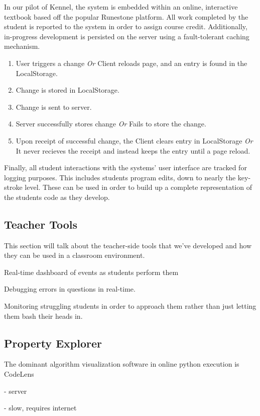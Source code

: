\documentclass{sig-alternate}
\begin{document}
In our pilot of Kennel, the system is embedded within an online, interactive textbook based off the popular Runestone platform. %
All work completed by the student is reported to the system in order to assign course credit.
Additionally, in-progress development is persisted on the server using a fault-tolerant caching mechanism.
\begin{enumerate}
  \item User triggers a change \textit{Or} Client reloads page, and an entry is found in the LocalStorage.
	\item Change is stored in LocalStorage.
	\item Change is sent to server.
  \item Server successfully stores change \textit{Or} Fails to store the change.
	\item Upon receipt of successful change, the Client clears entry in LocalStorage \textit{Or} It never recieves the receipt and instead keeps the entry until a page reload.
\end{enumerate}
Finally, all student interactions with the systems' user interface are tracked for logging purposes.
This includes students program edits, down to nearly the key-stroke level.
These can be used in order to build up a complete representation of the students code as they develop.
	
\subsection{Teacher Tools}

This section will talk about the teacher-side tools that we've developed and how they can be used in a classroom environment.

Real-time dashboard of events as students perform them

Debugging errors in questions in real-time.

Monitoring struggling students in order to approach them rather than just letting them bash their heads in.
	
\subsection{Property Explorer}

The dominant algorithm visualization software in online python execution is CodeLens

- server

- slow, requires internet
\end{document}
